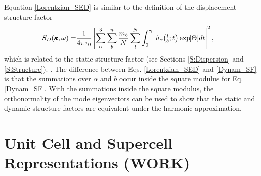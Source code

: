 Equation \eqref{Lorentzian_SED} is similar to the definition of 
the displacement structure factor
\cite{volz_molecular-dynamics_2000,horbach_high_2001,
martin-mayor_dynamical_2001,christie_vibrational_2007,
beltukov_ioffe-regel_2013}
\begin{equation}\label{Dynam_SF}
\begin{split}
S_{D}(\pmb{\kappa},\omega) = & \frac{1}{4\pi\tau_0} \left| \sum_\alpha^3 
\sum_b^n \frac{m_b}{N}
 \sum_l^N  \int_{0}^{\tau_0} \dot{u}_{\alpha}\mspace{-4.0mu}\left(\mspace{-8.0mu} \begin{smallmatrix}&l \\&b\end{smallmatrix}\mspace{-2.0mu};t\right) \exp\mspace{-5.0mu}\left[\Theta\right]\mspace{-3.0mu} dt 
\right|^2,
\end{split}
\end{equation}
which is related to the static structure factor 
\cite{biswas_vibrational_1988,feldman_thermal_1993,
allen_diffusons_1999,feldman_numerical_1999,
taraskin_determination_1999,taraskin_propagation_2000,
feldman_calculations_2002,ciliberti_brillouin_2003,
shintani_universal_2008,wyart_scaling_2010,
beltukov_ioffe-regel_2013,larkin_predicting_2013,
marruzzo_heterogeneous_2013} (see Sections \ref{S:Dispersion} 
and \ref{S:Structure}). 
\cite{beltukov_ioffe-regel_2013}. The difference between Eqs. 
\eqref{Lorentzian_SED} and \eqref{Dynam_SF} is that the 
summations over $\alpha$ and $b$ occur inside the square modulus 
for Eq. \eqref{Dynam_SF}. With the summations inside the 
square modulus, the orthonormality of the mode eigenvectors 
can be used to show that the static and dynamic 
structure factors are equivalent under the harmonic approximation.
\cite{beltukov_ioffe-regel_2013} 



\section{\label{A:unitcell}Unit Cell and Supercell Representations (WORK)}

